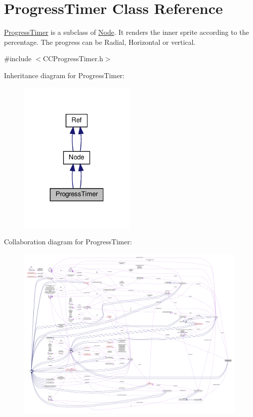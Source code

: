 \hypertarget{classProgressTimer}{}\section{Progress\+Timer Class Reference}
\label{classProgressTimer}


\hyperlink{classProgressTimer}{Progress\+Timer} is a subclass of \hyperlink{classNode}{Node}. It renders the inner sprite according to the percentage. The progress can be Radial, Horizontal or vertical.  




{\ttfamily \#include $<$C\+C\+Progress\+Timer.\+h$>$}



Inheritance diagram for Progress\+Timer\+:
\nopagebreak
\begin{figure}[H]
\begin{center}
\leavevmode
\includegraphics[width=160pt]{classProgressTimer__inherit__graph}
\end{center}
\end{figure}


Collaboration diagram for Progress\+Timer\+:
\nopagebreak
\begin{figure}[H]
\begin{center}
\leavevmode
\includegraphics[width=350pt]{classProgressTimer__coll__graph}
\end{center}
\end{figure}
